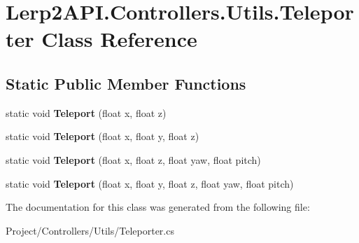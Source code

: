 \hypertarget{class_lerp2_a_p_i_1_1_controllers_1_1_utils_1_1_teleporter}{}\section{Lerp2\+A\+P\+I.\+Controllers.\+Utils.\+Teleporter Class Reference}
\label{class_lerp2_a_p_i_1_1_controllers_1_1_utils_1_1_teleporter}
\subsection*{Static Public Member Functions}
\begin{DoxyCompactItemize}
\item 
\mbox{\label{class_lerp2_a_p_i_1_1_controllers_1_1_utils_1_1_teleporter_a9129719b3960fdf32fc23c959b6e6011}} 
static void {\bfseries Teleport} (float x, float z)
\item 
\mbox{\label{class_lerp2_a_p_i_1_1_controllers_1_1_utils_1_1_teleporter_aa29a067a3c1f0f0c870baa8525b59252}} 
static void {\bfseries Teleport} (float x, float y, float z)
\item 
\mbox{\label{class_lerp2_a_p_i_1_1_controllers_1_1_utils_1_1_teleporter_ac6ef87a99fe92235f0e0a60ceb5425a8}} 
static void {\bfseries Teleport} (float x, float z, float yaw, float pitch)
\item 
\mbox{\label{class_lerp2_a_p_i_1_1_controllers_1_1_utils_1_1_teleporter_a5c2278372f1b2f82b94cbd38d5857db1}} 
static void {\bfseries Teleport} (float x, float y, float z, float yaw, float pitch)
\end{DoxyCompactItemize}


The documentation for this class was generated from the following file\+:\begin{DoxyCompactItemize}
\item 
Project/\+Controllers/\+Utils/Teleporter.\+cs\end{DoxyCompactItemize}
